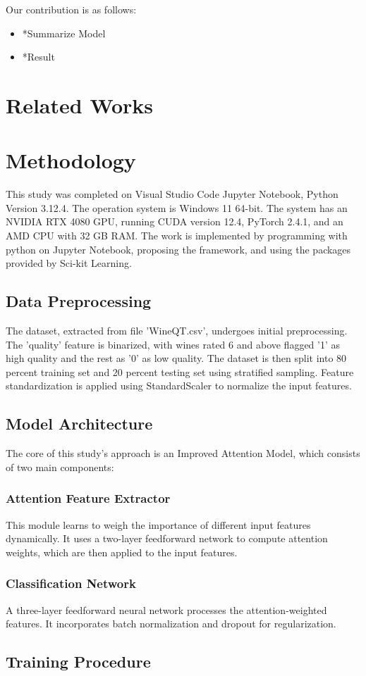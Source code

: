 \documentclass[conference]{IEEEtran}
\begin{document}
Our contribution is as follows:
\begin{itemize}
    \item *Summarize Model
    \item *Result
\end{itemize}


\section{Related Works}

\subsubsection{}

\section{Methodology}
This study was completed on Visual Studio Code Jupyter Notebook, Python Version 3.12.4. The operation system is Windows 11 64-bit. The system has an NVIDIA RTX 4080 GPU, running CUDA version 12.4, PyTorch 2.4.1, and an AMD CPU with 32 GB RAM. The work is implemented by programming with python on Jupyter Notebook, proposing the framework, and using the packages provided by Sci-kit Learning. 

\subsection{Data Preprocessing}
The dataset, extracted from file 'WineQT.csv', undergoes initial preprocessing. The 'quality' feature is binarized, with wines rated 6 and above flagged '1' as high quality and the rest as '0' as low quality. The dataset is then split into 80 percent training set and 20 percent testing set using stratified sampling. Feature standardization is applied using StandardScaler to normalize the input features.

\subsection{Model Architecture}
The core of this study's approach is an Improved Attention Model, which consists of two main components:

\subsubsection{Attention Feature Extractor}
This module learns to weigh the importance of different input features dynamically. It uses a two-layer feedforward network to compute attention weights, which are then applied to the input features.
\subsubsection{Classification Network}
A three-layer feedforward neural network processes the attention-weighted features. It incorporates batch normalization and dropout for regularization.

\subsection{Training Procedure}
\end{document}
